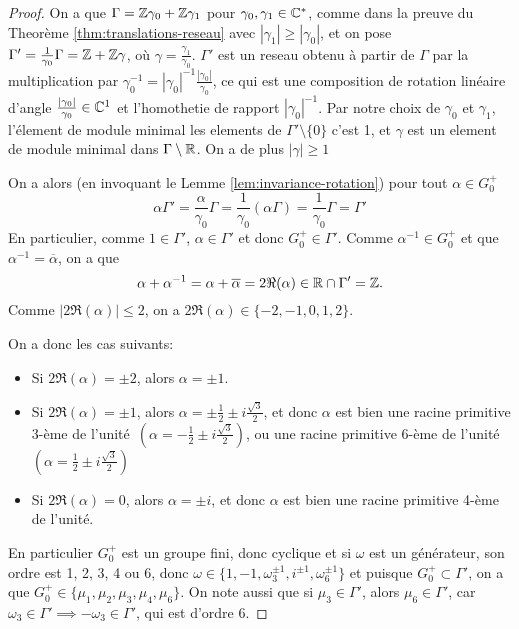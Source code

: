 \begin{proof}
	On a que $\Gamma = \mathbb{Z}\gamma_0 + \mathbb{Z}\gamma_1$ pour $\gamma_0, \gamma_1 \in \mathbb{C}^*$, 
	comme dans la preuve du Theorème \ref{thm:translations-reseau}
	avec $|\gamma_1| \geq |\gamma_0|$, et on pose
	$\Gamma ' = \frac{1}{\gamma_0} \Gamma = \mathbb{Z} + \mathbb{Z}\gamma$, où
	$\gamma = \frac{\gamma_1}{\gamma_0}$. $\Gamma'$ est un reseau obtenu
	à partir de $\Gamma$ par la multiplication par
	$\gamma_0^{-1} = |\gamma_0|^{-1}\frac{|\gamma_0|}{\gamma_0}$,
	ce qui est une composition de rotation linéaire d'angle
	$\frac{|\gamma_0|}{\gamma_0} \in \mathbb{C}^1$ et l'homothetie de rapport
	$|\gamma_0|^{-1}$. Par notre choix de $\gamma_0$ et $\gamma_1$, l'élement de module
	minimal les elements de $\Gamma' \setminus \{0\}$ c'est 1, et
	$\gamma$ est un element de module minimal dans $\Gamma \setminus \mathbb{R}$.
	On a de plus $|\gamma| \geq 1$

	On a alors (en invoquant le Lemme \ref{lem:invariance-rotation})
	pour tout $\alpha \in G_0^+$
	\begin{equation*}
		\alpha\Gamma' = \frac{\alpha}{\gamma_0}\Gamma =
		\frac{1}{\gamma_0}(\alpha\Gamma) = \frac{1}{\gamma_0}\Gamma = \Gamma'
	\end{equation*}
	En particulier, comme $1 \in \Gamma'$, $\alpha \in \Gamma'$ et donc
	$G_0^+ \in \Gamma'$. Comme $\alpha^{-1} \in G_0^+$ et que
	$\alpha^{-1} = \overline{\alpha}$, on a que 
	\begin{equation*}
		\alpha + \alpha^{-1} = \alpha + \overline{\alpha} =
		2 \Re(\alpha) \in \mathbb{R} \cap \Gamma' = \mathbb{Z}.
	\end{equation*}
	Comme $|2\Re(\alpha)| \leq 2$, on a $2\Re(\alpha) \in \{-2, -1, 0, 1, 2\}$.
	
	On a donc les cas suivants:
	\begin{itemize}
		\item Si $2\Re(\alpha) = \pm 2$, alors $\alpha = \pm 1$.
		\item Si $2\Re(\alpha) = \pm 1$, alors $\alpha = \pm\frac{1}{2} \pm
			i\frac{\sqrt{3}}{2}$, et donc $\alpha$ est bien une
			racine primitive 3-ème de
			l'unité $(\alpha = -\frac{1}{2} \pm i\frac{\sqrt{3}}{2})$, ou
			une racine primitive 6-ème de l'unité
			$(\alpha = \frac{1}{2} \pm i\frac{\sqrt{3}}{2})$
		\item Si $2\Re(\alpha) = 0$, alors $\alpha = \pm i$, et donc $\alpha$ est
			bien une racine primitive 4-ème de l'unité.
	\end{itemize}
	En particulier $G_0^+$ est un groupe fini, donc cyclique et
	si $\omega$ est un générateur, son ordre est 1, 2, 3, 4 ou 6,
	donc $\omega \in \{1, -1, \omega_3^{\pm 1}, i^{\pm 1}, \omega_6^{\pm 1}\}$
	et puisque $G_0^+ \subset \Gamma'$, on a que
	$G_0^+ \in \{\mu_1, \mu_2, \mu_3, \mu_4, \mu_6\}$.
	On note aussi que si $\mu_3 \in \Gamma'$, alors $\mu_6 \in \Gamma'$,
	car $\omega_3 \in \Gamma' \implies -\omega_3 \in \Gamma'$, qui est d'ordre 6.


\end{proof}
